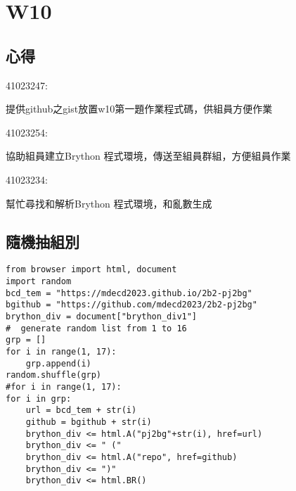 \chapter{W10}
\section{心得}
41023247:

提供github之gist放置w10第一題作業程式碼，供組員方便作業

41023254:

協助組員建立Brython 程式環境，傳送至組員群組，方便組員作業

41023234:

幫忙尋找和解析Brython 程式環境，和亂數生成
\section{隨機抽組別}
\lstset{
    language=Python,
    frame=single,
    numbers=left,
    captionpos=b,
    basicstyle=\ttfamily\small,
    showstringspaces=false,
    breaklines=true,
    tabsize=4,
    xleftmargin=15pt,
}
\begin{lstlisting}
from browser import html, document
import random
bcd_tem = "https://mdecd2023.github.io/2b2-pj2bg"
bgithub = "https://github.com/mdecd2023/2b2-pj2bg"
brython_div = document["brython_div1"]
#  generate random list from 1 to 16
grp = []
for i in range(1, 17):
    grp.append(i)
random.shuffle(grp)
#for i in range(1, 17):
for i in grp:
    url = bcd_tem + str(i)
    github = bgithub + str(i)
    brython_div <= html.A("pj2bg"+str(i), href=url)
    brython_div <= " ("
    brython_div <= html.A("repo", href=github)
    brython_div <= ")"
    brython_div <= html.BR()
\end{lstlisting}